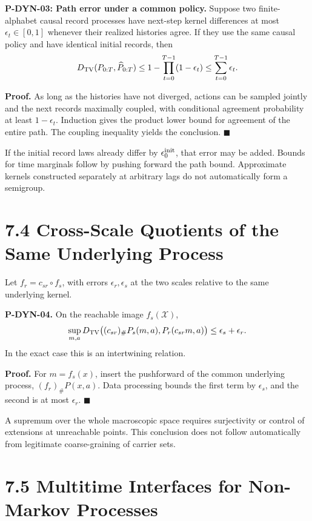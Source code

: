\documentclass[
  english,
  11pt,
  oneside]{book}
\begin{document}
\hypertarget{p-dyn-03}{}\label{p-dyn-03}

\textbf{P-DYN-03: Path error under a common policy.} Suppose two finite-alphabet causal record processes have next-step kernel differences at most \(\epsilon_t\in[0,1]\) whenever their realized histories agree. If they use the same causal policy and have identical initial records, then \[D_{\rm TV}(P_{0:T},\widehat P_{0:T})
\le1-\prod_{t=0}^{T-1}(1-\epsilon_t)
\le\sum_{t=0}^{T-1}\epsilon_t.\]

\textbf{Proof.} As long as the histories have not diverged, actions can be sampled jointly and the next records maximally coupled, with conditional agreement probability at least \(1-\epsilon_t\). Induction gives the product lower bound for agreement of the entire path. The coupling inequality yields the conclusion. \(\blacksquare\)

If the initial record laws already differ by \(\epsilon_0^{\rm init}\), that error may be added. Bounds for time marginals follow by pushing forward the path bound. Approximate kernels constructed separately at arbitrary lags do not automatically form a semigroup.

\section{7.4 Cross-Scale Quotients of the Same Underlying Process}\label{cross-scale-quotients-of-the-same-underlying-process}

Let \(f_r=c_{sr}\circ f_s\), with errors \(\epsilon_r,\epsilon_s\) at the two scales relative to the same underlying kernel.

\hypertarget{p-dyn-04}{}\label{p-dyn-04}

\textbf{P-DYN-04.} On the reachable image \(f_s(\mathcal X)\), \[\sup_{m,a}D_{\rm TV}
\bigl((c_{sr})_\#P_s(m,a),P_r(c_{sr}m,a)\bigr)
\le\epsilon_s+\epsilon_r.\] In the exact case this is an intertwining relation.

\textbf{Proof.} For \(m=f_s(x)\), insert the pushforward of the common underlying process, \((f_r)_\#P(x,a)\). Data processing bounds the first term by \(\epsilon_s\), and the second is at most \(\epsilon_r\). \(\blacksquare\)

A supremum over the whole macroscopic space requires surjectivity or control of extensions at unreachable points. This conclusion does not follow automatically from legitimate coarse-graining of carrier sets.

\section{7.5 Multitime Interfaces for Non-Markov Processes}\label{multitime-interfaces-for-non-markov-processes}
\end{document}

